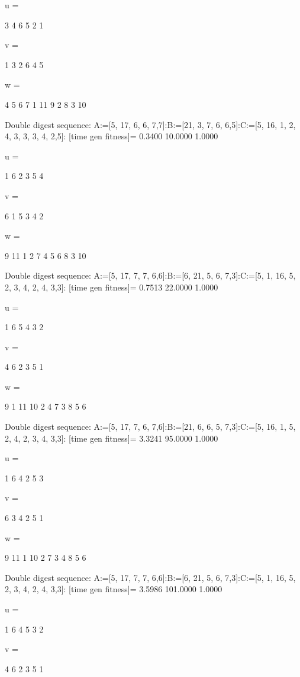 u =

     3     4     6     5     2     1


v =

     1     3     2     6     4     5


w =

     4     5     6     7     1    11     9     2     8     3    10

Double digest sequence:
A:=[5, 17, 6, 6, 7,7]:B:=[21, 3, 7, 6, 6,5]:C:=[5, 16, 1, 2, 4, 3, 3, 3, 4, 2,5]:
[time gen fitness]=
    0.3400   10.0000    1.0000


u =

     1     6     2     3     5     4


v =

     6     1     5     3     4     2


w =

     9    11     1     2     7     4     5     6     8     3    10

Double digest sequence:
A:=[5, 17, 7, 7, 6,6]:B:=[6, 21, 5, 6, 7,3]:C:=[5, 1, 16, 5, 2, 3, 4, 2, 4, 3,3]:
[time gen fitness]=
    0.7513   22.0000    1.0000


u =

     1     6     5     4     3     2


v =

     4     6     2     3     5     1


w =

     9     1    11    10     2     4     7     3     8     5     6

Double digest sequence:
A:=[5, 17, 7, 6, 7,6]:B:=[21, 6, 6, 5, 7,3]:C:=[5, 16, 1, 5, 2, 4, 2, 3, 4, 3,3]:
[time gen fitness]=
    3.3241   95.0000    1.0000


u =

     1     6     4     2     5     3


v =

     6     3     4     2     5     1


w =

     9    11     1    10     2     7     3     4     8     5     6

Double digest sequence:
A:=[5, 17, 7, 7, 6,6]:B:=[6, 21, 5, 6, 7,3]:C:=[5, 1, 16, 5, 2, 3, 4, 2, 4, 3,3]:
[time gen fitness]=
    3.5986  101.0000    1.0000


u =

     1     6     4     5     3     2


v =

     4     6     2     3     5     1


